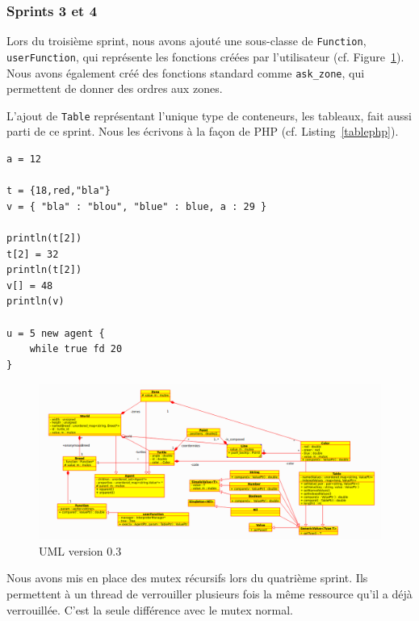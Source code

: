 \subsubsection{Sprints 3 et 4}
Lors du troisième sprint, nous avons ajouté une sous-classe de \verb|Function|, \verb|userFunction|, qui représente les fonctions créées par l'utilisateur (cf. Figure~\ref{v0.3}). Nous avons également créé des fonctions standard comme \verb|ask_zone|, qui permettent de donner des ordres aux zones.

L'ajout de \verb|Table| représentant l'unique type de conteneurs, les tableaux, fait aussi parti de ce sprint.
Nous les écrivons à la façon de PHP (cf. Listing~\ref{tablephp}).
\begin{lstlisting}[label=tablephp,caption=Syntaxe des tables en Stibbons]
a = 12

t = {18,red,"bla"}
v = { "bla" : "blou", "blue" : blue, a : 29 }

println(t[2])
t[2] = 32
println(t[2])
v[] = 48
println(v)

u = 5 new agent {
	while true fd 20
}
\end{lstlisting}

\begin{figure}[h]
\centering
\includegraphics[scale=0.4]{doc/report/uml/v03.png}
\caption{\label{v0.3} UML version 0.3}
\end{figure}

Nous avons mis en place des mutex récursifs lors du quatrième sprint. Ils permettent à un thread de verrouiller plusieurs fois la même ressource qu'il a déjà verrouillée. C'est la seule différence avec le mutex normal. 

